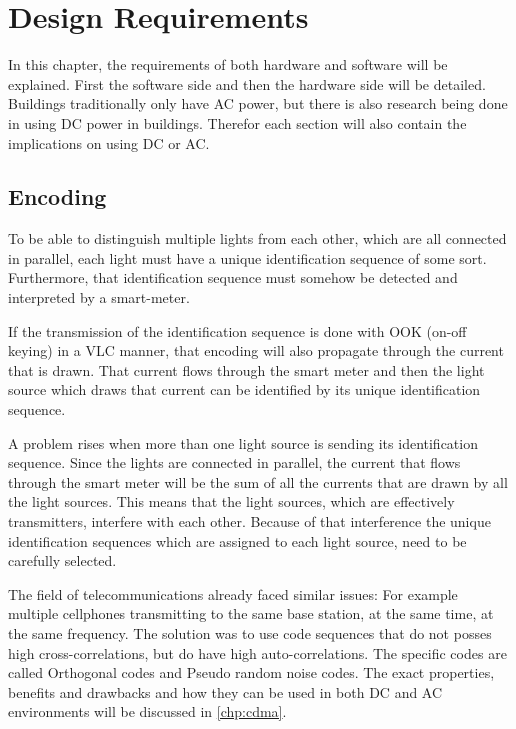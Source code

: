 
\chapter{Design Requirements}
\label{chp:design-requirements}

In this chapter, the requirements of both hardware and software will be explained.
First the software side and then the hardware side will be detailed.
Buildings traditionally only have AC power, but there is also research being done  in using DC power in buildings. 
Therefor each section will also contain the implications on using DC or AC.


	\section{Encoding}

	To be able to distinguish multiple lights from each other, which are all connected in parallel, each light must have a unique identification sequence of some sort.
	Furthermore, that identification sequence must somehow be detected and interpreted by a smart-meter.


	If the transmission of the identification sequence is done with OOK (on-off keying) in a VLC manner, that encoding will also propagate through the current that is drawn.
	That current flows through the smart meter and then the light source which draws that current can be identified by its unique identification sequence. 


	A problem rises when more than one light source is sending its identification sequence.
	Since the lights are connected in parallel, the current that flows through the smart meter will be the sum of all the currents that are drawn by all the light sources.
	This means that the light sources, which are effectively transmitters, interfere with each other.
	Because of that interference the unique identification sequences which are assigned to each light source, need to be carefully selected.


	The field of telecommunications already faced similar issues: For example multiple cellphones transmitting to the same base station, at the same time, at the same frequency. 
	The solution was to use code sequences that do not posses high cross-correlations, but do have high auto-correlations.
	The specific codes are called Orthogonal codes and Pseudo random noise codes.
	The exact properties, benefits and drawbacks and how they can be used in both DC and AC environments will be discussed in \autoref{chp:cdma}.




